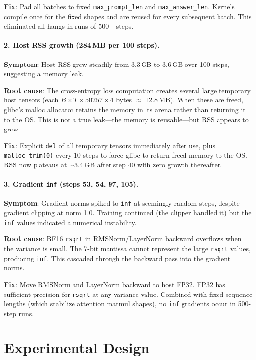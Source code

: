 \documentclass[11pt,a4paper]{article}
\begin{document}
\textbf{Fix}: Pad all batches to fixed \texttt{max\_prompt\_len} and \texttt{max\_answer\_len}. Kernels compile once for the fixed shapes and are reused for every subsequent batch. This eliminated all hangs in runs of 500+ steps.

\paragraph{2. Host RSS growth (284\,MB per 100 steps).}

\textbf{Symptom}: Host RSS grew steadily from 3.3\,GB to 3.6\,GB over 100 steps, suggesting a memory leak.

\textbf{Root cause}: The cross-entropy loss computation creates several large temporary host tensors (each $B \times T \times 50257 \times 4$ bytes $\approx$ 12.8\,MB). When these are freed, glibc's malloc allocator retains the memory in its arena rather than returning it to the OS. This is not a true leak---the memory is reusable---but RSS appears to grow.

\textbf{Fix}: Explicit \texttt{del} of all temporary tensors immediately after use, plus \texttt{malloc\_trim(0)} every 10 steps to force glibc to return freed memory to the OS. RSS now plateaus at $\sim$3.4\,GB after step 40 with zero growth thereafter.

\paragraph{3. Gradient \texttt{inf} (steps 53, 54, 97, 105).}

\textbf{Symptom}: Gradient norms spiked to \texttt{inf} at seemingly random steps, despite gradient clipping at norm 1.0. Training continued (the clipper handled it) but the \texttt{inf} values indicated a numerical instability.

\textbf{Root cause}: BF16 \texttt{rsqrt} in RMSNorm/LayerNorm backward overflows when the variance is small. The 7-bit mantissa cannot represent the large \texttt{rsqrt} values, producing \texttt{inf}. This cascaded through the backward pass into the gradient norms.

\textbf{Fix}: Move RMSNorm and LayerNorm backward to host FP32. FP32 has sufficient precision for \texttt{rsqrt} at any variance value. Combined with fixed sequence lengths (which stabilize attention matmul shapes), no \texttt{inf} gradients occur in 500-step runs.

\section{Experimental Design}
\label{sec:experiments}
\end{document}

